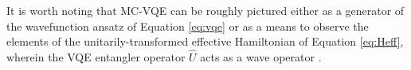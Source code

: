 \documentclass[aps,prl,twocolumn,showpacs,superscriptaddress,groupedaddress]{revtex4}  %
\begin{document}
It is worth noting that MC-VQE can be roughly pictured either as a generator
of the wavefunction ansatz of Equation \ref{eq:vqe} or as a means to observe
the elements of the unitarily-transformed effective Hamiltonian of Equation
\ref{eq:Heff}, wherein the VQE entangler operator $\hat U$ acts as a
wave operator \cite{durand1983direct,maynau1983direct}. 


\end{document}

